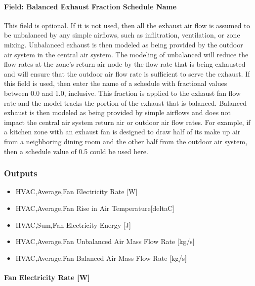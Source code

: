 \paragraph{Field: Balanced Exhaust Fraction Schedule Name}\label{field-balanced-exhaust-fraction-schedule-name}

This field is optional. If it is not used, then all the exhaust air flow is assumed to be unbalanced by any simple airflows, such as infiltration, ventilation, or zone mixing. Unbalanced exhaust is then modeled as being provided by the outdoor air system in the central air system. The modeling of unbalanced will reduce the flow rates at the zone's return air node by the flow rate that is being exhausted and will ensure that the outdoor air flow rate is sufficient to serve the exhaust. If this field is used, then enter the name of a schedule with fractional values between 0.0 and 1.0, inclusive. This fraction is applied to the exhaust fan flow rate and the model tracks the portion of the exhaust that is balanced. Balanced exhaust is then modeled as being provided by simple airflows and does not impact the central air system return air or outdoor air flow rates. For example, if a kitchen zone with an exhaust fan is designed to draw half of its make up air from a neighboring dining room and the other half from the outdoor air system, then a schedule value of 0.5 could be used here.

\subsubsection{Outputs}\label{outputs-3-007}

\begin{itemize}
\item
  HVAC,Average,Fan Electricity Rate {[}W{]}
\item
  HVAC,Average,Fan Rise in Air Temperature{[}deltaC{]}
\item
  HVAC,Sum,Fan Electricity Energy {[}J{]}
\item
  HVAC,Average,Fan Unbalanced Air Mass Flow Rate {[}kg/s{]}
\item
  HVAC,Average,Fan Balanced Air Mass Flow Rate {[}kg/s{]}
\end{itemize}

\paragraph{Fan Electricity Rate {[}W{]}}\label{fan-electric-power-w-3}

